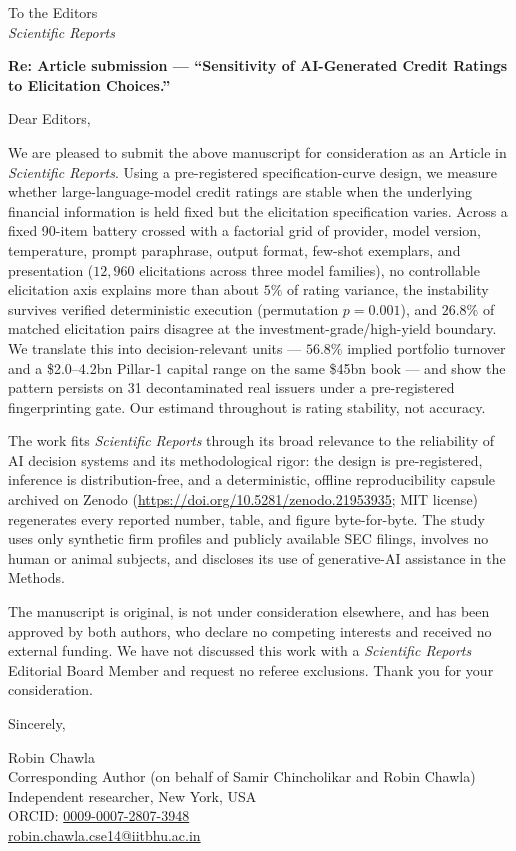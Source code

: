 \documentclass[11pt]{article}
\begin{document}
\noindent To the Editors\\
\emph{Scientific Reports}

\vspace{6pt}
\noindent\textbf{Re: Article submission --- ``Sensitivity of AI-Generated Credit Ratings to Elicitation Choices.''}

\vspace{6pt}
\noindent Dear Editors,

We are pleased to submit the above manuscript for consideration as an Article in \emph{Scientific Reports}. Using a pre-registered specification-curve design, we measure whether large-language-model credit ratings are stable when the underlying financial information is held fixed but the elicitation specification varies. Across a fixed 90-item battery crossed with a factorial grid of provider, model version, temperature, prompt paraphrase, output format, few-shot exemplars, and presentation ($12{,}960$ elicitations across three model families), no controllable elicitation axis explains more than about $5\%$ of rating variance, the instability survives verified deterministic execution (permutation $p=0.001$), and $26.8\%$ of matched elicitation pairs disagree at the investment-grade/high-yield boundary. We translate this into decision-relevant units --- $56.8\%$ implied portfolio turnover and a \$2.0--4.2bn Pillar-1 capital range on the same \$45bn book --- and show the pattern persists on 31 decontaminated real issuers under a pre-registered fingerprinting gate. Our estimand throughout is rating stability, not accuracy.

The work fits \emph{Scientific Reports} through its broad relevance to the reliability of AI decision systems and its methodological rigor: the design is pre-registered, inference is distribution-free, and a deterministic, offline reproducibility capsule archived on Zenodo (\url{https://doi.org/10.5281/zenodo.21953935}; MIT license) regenerates every reported number, table, and figure byte-for-byte. The study uses only synthetic firm profiles and publicly available SEC filings, involves no human or animal subjects, and discloses its use of generative-AI assistance in the Methods.

The manuscript is original, is not under consideration elsewhere, and has been approved by both authors, who declare no competing interests and received no external funding. We have not discussed this work with a \emph{Scientific Reports} Editorial Board Member and request no referee exclusions. Thank you for your consideration.

\vspace{12pt}
\noindent Sincerely,

\vspace{2pt}
\noindent Robin Chawla\\
Corresponding Author (on behalf of Samir Chincholikar and Robin Chawla)\\
Independent researcher, New York, USA\\
ORCID: \href{https://orcid.org/0009-0007-2807-3948}{0009-0007-2807-3948}\\
\href{mailto:robin.chawla.cse14@iitbhu.ac.in}{robin.chawla.cse14@iitbhu.ac.in}
\end{document}
